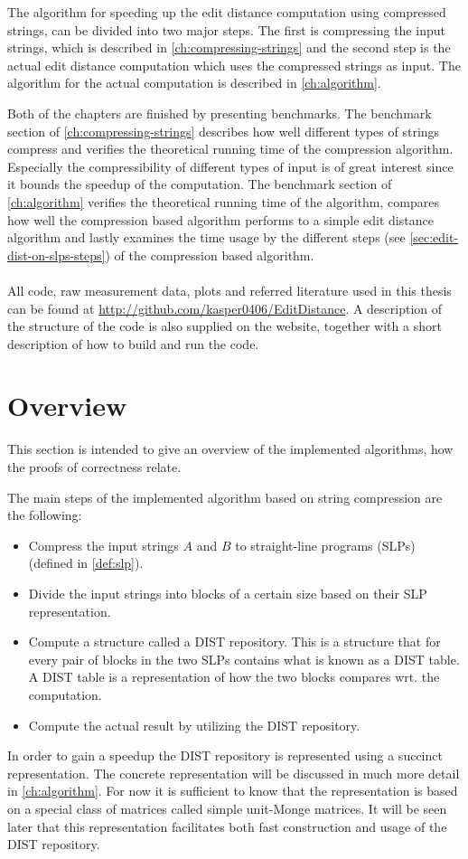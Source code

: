 \documentclass[twoside,11pt,openright]{report}
\newcommand{\thesisurl}{\url{http://github.com/kasper0406/EditDistance}}
\begin{document}
The algorithm for speeding up the edit distance computation using compressed strings, can be divided into two major steps. The first is compressing the input strings, which is described in \cref{ch:compressing-strings} and the second step is the actual edit distance computation which uses the compressed strings as input. The algorithm for the actual computation is described in \cref{ch:algorithm}.

Both of the chapters are finished by presenting benchmarks. The benchmark section of \cref{ch:compressing-strings} describes how well different types of strings compress and verifies the theoretical running time of the compression algorithm. Especially the compressibility of different types of input is of great interest since it bounds the speedup of the computation. The benchmark section of \cref{ch:algorithm} verifies the theoretical running time of the algorithm, compares how well the compression based algorithm performs to a simple edit distance algorithm and lastly examines the time usage by the different steps (see \cref{sec:edit-dist-on-slps-steps}) of the compression based algorithm.

\paragraph{}
All code, raw measurement data, plots and referred literature used in this thesis can be found at \thesisurl. A description of the structure of the code is also supplied on the website, together with a short description of how to build and run the code.

\section{Overview}
This section is intended to give an overview of the implemented algorithms, how the proofs of correctness relate.

The main steps of the implemented algorithm based on string compression are the following:
\begin{itemize}
  \item Compress the input strings $A$ and $B$ to straight-line programs (SLPs) (defined in \cref{def:slp}).
  \item Divide the input strings into blocks of a certain size based on their SLP representation.
  \item Compute a structure called a DIST repository. This is a structure that for every pair of blocks in the two SLPs contains what is known as a DIST table. A DIST table is a representation of how the two blocks compares wrt. the computation.
  \item Compute the actual result by utilizing the DIST repository.
\end{itemize}
In order to gain a speedup the DIST repository is represented using a succinct representation. The concrete representation will be discussed in much more detail in \cref{ch:algorithm}. For now it is sufficient to know that the representation is based on a special class of matrices called simple unit-Monge matrices. It will be seen later that this representation facilitates both fast construction and usage of the DIST repository.
\end{document}
